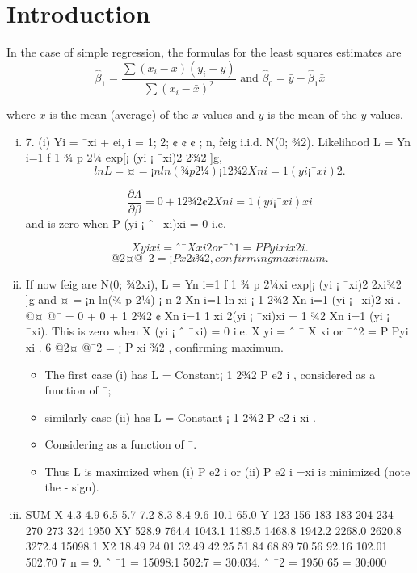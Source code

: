 \documentclass[a4paper,12pt]{article}
\begin{document}
\section{Introduction}
\begin{framed}
In the case of simple regression, the formulas for the least squares estimates are 
\[{\displaystyle {\widehat {\beta }}_{1}={\frac {\sum (x_{i}-{\bar {x}})(y_{i}-{\bar {y}})}{\sum (x_{i}-{\bar {x}})^{2}}}{\text{ and }}{\widehat {\beta }}_{0}={\bar {y}}-{\widehat {\beta }}_{1}{\bar {x}}} \]

where 
$ {\displaystyle {\bar {x}}} $
 is the mean (average) of the 
$ {\displaystyle x} $
 values and 
${\displaystyle {\bar {y}}}$ 
 is the mean of the 
$ {\displaystyle y} $
 values.

\end{framed}
\begin{enumerate}[(i)]
\item 7. (i) Yi = ¯xi + ei, i = 1; 2; ¢ ¢ ¢ ; n, feig i.i.d. N(0; ¾2).
Likelihood L =
Yn
i=1
f
1
¾
p
2¼
exp[¡
(yi ¡ ¯xi)2
2¾2 ]g,
\[lnL = ¤ = ¡n ln(¾
p
2¼) ¡ 1
2¾2
Xn
i=1
(yi ¡ ¯xi)2.\]

\[
\frac{\partial \Lambda}{\partial \beta}

= 0 +
1
2¾2
¢ 2
Xn
i=1
(yi ¡ ¯xi)xi\] and is zero when
P
(yi ¡ ˆ ¯xi)xi = 0 i.e.

\[X
yixi = ˆ ¯
X
xi
2 or ¯ˆ1 =
P
Pyixi
x2
i
.\]
\[@2¤
@¯2 = ¡
P
x2
i
¾2 , confirming maximum.\]

\item  If now feig are N(0; ¾2xi),
L =
Yn
i=1
f
1
¾
p
2¼xi
exp[¡
(yi ¡ ¯xi)2
2xi¾2 ]g
and ¤ = ¡n ln(¾
p
2¼) ¡ n
2
Xn
i=1
ln xi ¡
1
2¾2
Xn
i=1
(yi ¡ ¯xi)2
xi
.
@¤
@¯
= 0 + 0 +
1
2¾2
¢
Xn
i=1
1
xi
2(yi ¡ ¯xi)xi =
1
¾2
Xn
i=1
(yi ¡ ¯xi).
This is zero when
X
(yi ¡ ˆ ¯xi) = 0 i.e.
X
yi = ˆ ¯
X
xi or ¯ˆ2 =
P
Pyi
xi
.
6
@2¤
@¯2 = ¡
P
xi
¾2 , confirming maximum.
\begin{itemize}
\item The first case (i) has L = Constant¡ 1
2¾2
P
e2
i , considered as a function of ¯;
\item similarly case (ii) has L = Constant ¡ 1
2¾2
P e2
i
xi
. 
\item Considering as a function
of ¯. 
\item Thus L is maximized when (i)
P
e2
i or (ii)
P
e2
i =xi is minimized (note
the - sign).
\end{itemize}
\item 
SUM
X 4.3 4.9 6.5 5.7 7.2 8.3 8.4 9.6 10.1 65.0
Y 123 156 183 183 204 234 270 273 324 1950
XY 528.9 764.4 1043.1 1189.5 1468.8 1942.2 2268.0 2620.8 3272.4 15098.1
X2 18.49 24.01 32.49 42.25 51.84 68.89 70.56 92.16 102.01 502.70
7
n = 9. ˆ ¯1 = 15098:1
502:7 = 30:034. ˆ ¯2 = 1950
65 = 30:000


\end{enumerate}
\end{document}

